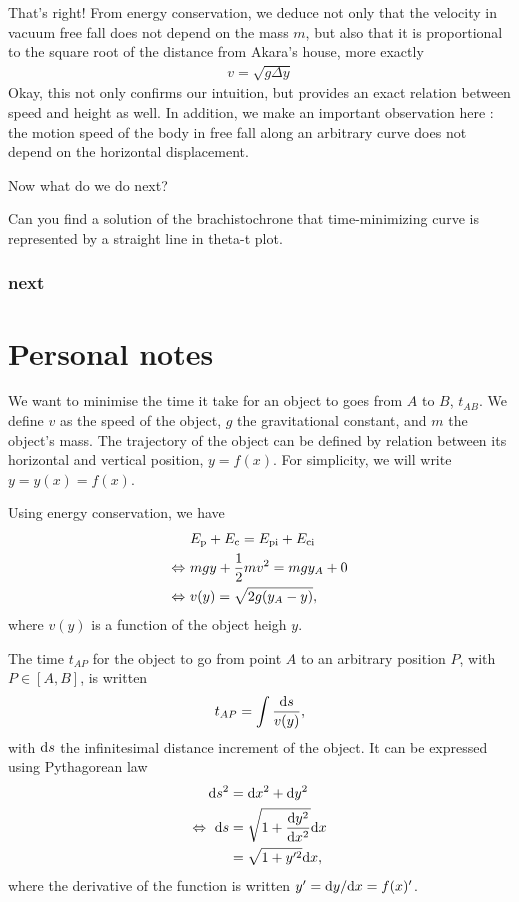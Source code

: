 \documentclass{article}
\begin{document}
That's right! From energy conservation, we deduce not only that the velocity in vacuum free fall does not depend on the mass $m$, but also that it is proportional to the square root of the distance from Akara's house, more exactly
\begin{align}
  \boxed{v = \sqrt{g \Delta y}}
\end{align}
Okay, this not only confirms our intuition, but provides an exact relation between speed and height as well. In addition, we make an important observation here : the motion speed of the body in free fall along an arbitrary curve does not depend on the horizontal displacement.

Now what do we do next?


Can you find a solution of the brachistochrone that time-minimizing curve is represented by a straight line in theta-t plot.

\subsubsection*{next}

\newpage
\section*{Personal notes}

We want to minimise the time it take for an object to goes from $A$ to $B$, $t_{AB}$. We define $v$ as the speed of the object, $g$ the gravitational constant, and $m$ the object's mass. The trajectory of the object can be defined by relation between its horizontal and vertical position, $y = f(x)$. For simplicity, we will write $y = y(x) = f(x)$.

Using energy conservation, we have
\begin{align}
  &E_{\text p} + E_{\text c} = E_{\text{pi}} + E_{\text{ci}}\nonumber\\
\Leftrightarrow~ & mgy + \frac 12 m v^2 = mgy_A + 0\nonumber\\
\Leftrightarrow~& v(y) = \sqrt{2 g(y_A - y)}, \label{eq:vtoy}
\end{align}
where $v(y)$ is a function of the object heigh $y$.

The time $t_{AP}$ for the object to go from point $A$ to an arbitrary position $P$, with $P\in[A, B]$, is written
\begin{align}
t_{AP} = \int \frac{\text d s }{v(y)}, \label{timeAP}
\end{align}
with $\text d s $ the infinitesimal distance increment of the object. It can be expressed using Pythagorean law
\begin{align}
\text d s^2  &= \text d x^2 + \text d y^2 \nonumber\\
\Leftrightarrow~ \text d s &= \sqrt{1 + \frac{\text d y^2}{\text d x^2}}\text d x\nonumber\\
 & = \sqrt{1 + y'^2}\text d x,\label{eq:dstodx}
\end{align}
where the derivative of the function is written $y' = \text d y/\text d x = f(x)'$.
\end{document}
